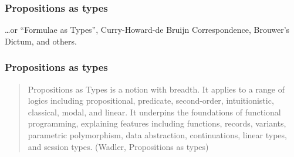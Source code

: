 \documentclass{beamer}
\begin{document}
\begin{frame}

    \frametitle{Propositions as types}

    \dots or ``Formulae as Types'', Curry-Howard-de Bruijn
    Correspondence, Brouwer’s Dictum, and others.

    \begin{itemize}
    
    
    
    \end{itemize}

\end{frame}

\begin{frame}

    \frametitle{Propositions as types}

    \begin{quotation}
    
        Propositions as Types is a notion with breadth. It applies to a
        range of logics including propositional, predicate,
        second-order, intuitionistic, classical, modal, and linear. It
        underpins the foundations of functional programming, explaining
        features including functions, records, variants, parametric
        polymorphism, data abstraction, continuations, linear types, and
        session types. (Wadler, Propositions as types)
    
    \end{quotation}

\end{frame}
\end{document}
